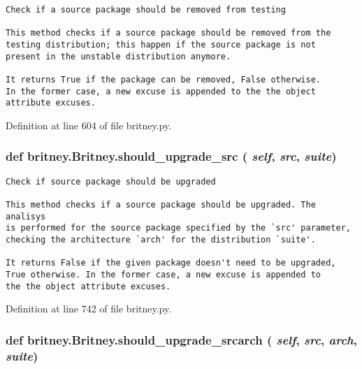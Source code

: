\footnotesize\begin{verbatim}Check if a source package should be removed from testing

This method checks if a source package should be removed from the
testing distribution; this happen if the source package is not
present in the unstable distribution anymore.

It returns True if the package can be removed, False otherwise.
In the former case, a new excuse is appended to the the object
attribute excuses.
\end{verbatim}
\normalsize
 

Definition at line 604 of file britney.py.
\subsubsection{\setlength{\rightskip}{0pt plus 5cm}def britney.Britney.should\_\-upgrade\_\-src ( {\em self},  {\em src},  {\em suite})}\label{classbritney_1_1Britney_94785175a85f44b1afaf3add167a211f}




\footnotesize\begin{verbatim}Check if source package should be upgraded

This method checks if a source package should be upgraded. The analisys
is performed for the source package specified by the `src' parameter, 
checking the architecture `arch' for the distribution `suite'.
       
It returns False if the given package doesn't need to be upgraded,
True otherwise. In the former case, a new excuse is appended to
the the object attribute excuses.
\end{verbatim}
\normalsize
 

Definition at line 742 of file britney.py.
\subsubsection{\setlength{\rightskip}{0pt plus 5cm}def britney.Britney.should\_\-upgrade\_\-srcarch ( {\em self},  {\em src},  {\em arch},  {\em suite})}\label{classbritney_1_1Britney_bd18d7acde434387e94344a39db5b0e5}




